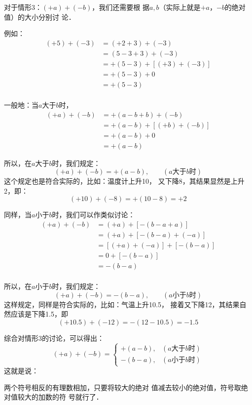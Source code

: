 对于情形3：$(+a)+(-b)$，我们还需要根
据$a,b$（实际上就是$+a$，$-b$的绝对值）的大小分别讨
论．

例如：
\begin{align*}
(+5)+(-3)&=(+2+3)+(-3)\\
&=(5-3 + 3)+(-3)\\
&=+(5-3)+[(+3)+(-3)]\tag{加法结合律}\\
&=+(5-3)+0 \tag{相反数的性质}\\
&=+(5-3)\tag{零的特性}\\
\end{align*}

一般地：当$a$大于$b$时，
\begin{align*}
(+ a)+(-b)&=+(a-b + b)+(-b)\\
&=+(a-b)+[(+b)+(-b)]    \tag{加法结合律}\\
& =+(a-b) + 0 \tag{零的特性}\\
&  =+(a-b)
\end{align*}

所以，在$a$大于$b$时，我们规定：
\[(+a)+(-b)=+(a-b),\qquad (\text{$a$大于$b$时})\]
这个规定也是符合实际的，比如：温度计上升10\oc，
又下降8\oc，其结果显然是上升2\oc，即：
\[     (+10)+(-8)=+(10-8)=+2\]

同样，当$a$小于$b$时，我们可以作类似讨论：
\begin{align*}
(+ a)+(-b)&=(+ a)+[-(b-a+a)]\\
& =(+ a)+[-(b-a)+( -a)]   \tag{情形2加法法则}\\
&=[(+ a)+(-a)]+[-(b-a) ]  \tag{加法交换、结合律}\\
&=0+[-(b-a)]\tag{相反数的特性}\\
&=-(b-a)\tag{零的特性}\\
\end{align*}


所以，在$a$小于$b$时，我们规定：
\[(+a)+(-b)=-(b-a),\qquad (\text{$a$小于$b$时})\]
这样规定，同样是符合实际的，比如：气温上升10.5\oc，
接着又下降12\oc，其结果自然应该是下降1.5\oc，即
\[(+10.5)+(-12)=-(12-10.5)=-1.5\]

综合对情形3的讨论，可以得出：
\[(+a)+(-b)=\begin{cases}
+(a-b),& (\text{$a$大于$b$时})\\
-(b-a),& (\text{$a$小于$b$时})
\end{cases}\]
这就是说：

\begin{blk}{}
	两个符号相反的有理数相加，只要将较大的绝对
	值减去较小的绝对值，符号取绝对值较大的加数的符
	号就行了．
\end{blk}

